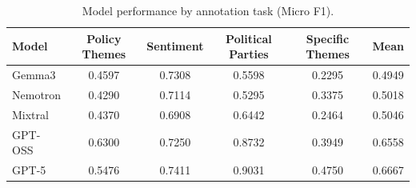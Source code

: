 \begin{table}[h!]
\centering
\caption{Model performance by annotation task (Micro F1).}
\label{tab:per_task_results}
\begin{tabular}{lccccc}
\toprule
\textbf{Model} & \textbf{Policy Themes} & \textbf{Sentiment} & \textbf{Political Parties} & \textbf{Specific Themes} & \textbf{Mean} \\
\midrule
Gemma3 & 0.4597 & 0.7308 & 0.5598 & 0.2295 & 0.4949 \\
Nemotron & 0.4290 & 0.7114 & 0.5295 & 0.3375 & 0.5018 \\
Mixtral & 0.4370 & 0.6908 & 0.6442 & 0.2464 & 0.5046 \\
GPT-OSS & 0.6300 & 0.7250 & 0.8732 & 0.3949 & 0.6558 \\
GPT-5 & 0.5476 & 0.7411 & 0.9031 & 0.4750 & 0.6667 \\
\bottomrule
\end{tabular}
\end{table}